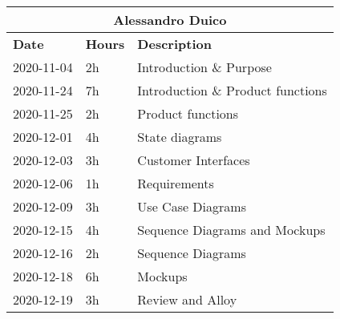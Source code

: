 \begin{table}[H]
    \centering
    \begin{tabular}{|l|l|l|}
        \multicolumn{3}{c}{\textbf{Alessandro Duico}}                      \\
        \hline
        \textbf{Date} & \textbf{Hours} & \textbf{Description}              \\\hline
        2020-11-04    & 2h             & Introduction \& Purpose           \\\hline
        2020-11-24    & 7h             & Introduction \& Product functions \\\hline
        2020-11-25    & 2h             & Product functions                 \\\hline
        2020-12-01    & 4h             & State diagrams                    \\\hline
        2020-12-03    & 3h             & Customer Interfaces               \\\hline
        2020-12-06    & 1h             & Requirements                      \\\hline
        2020-12-09    & 3h             & Use Case Diagrams                 \\\hline
        2020-12-15    & 4h             & Sequence Diagrams and Mockups     \\\hline
        2020-12-16    & 2h             & Sequence Diagrams                 \\\hline
        2020-12-18    & 6h             & Mockups                           \\\hline
        2020-12-19    & 3h             & Review and Alloy                  \\\hline
    \end{tabular}
\end{table}